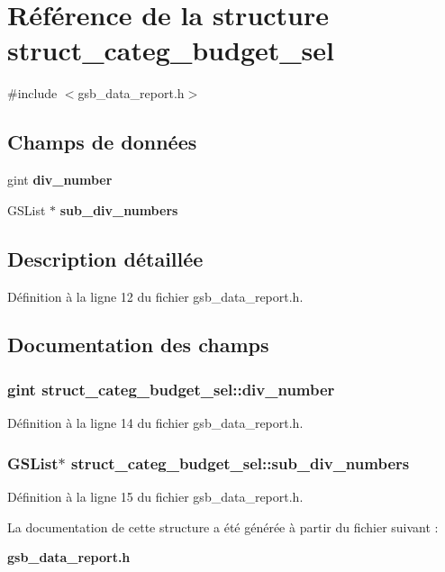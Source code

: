 \section{Référence de la structure struct\_\-categ\_\-budget\_\-sel}
\label{structstruct__categ__budget__sel}


{\ttfamily \#include $<$gsb\_\-data\_\-report.h$>$}

\subsection*{Champs de données}
\begin{DoxyCompactItemize}
\item 
gint {\bf div\_\-number}
\item 
GSList $\ast$ {\bf sub\_\-div\_\-numbers}
\end{DoxyCompactItemize}


\subsection{Description détaillée}


Définition à la ligne 12 du fichier gsb\_\-data\_\-report.h.



\subsection{Documentation des champs}
\subsubsection[{div\_\-number}]{\setlength{\rightskip}{0pt plus 5cm}gint {\bf struct\_\-categ\_\-budget\_\-sel::div\_\-number}}\label{structstruct__categ__budget__sel_ab4d8a88c70542ed25a12d707c95a7cfc}


Définition à la ligne 14 du fichier gsb\_\-data\_\-report.h.

\subsubsection[{sub\_\-div\_\-numbers}]{\setlength{\rightskip}{0pt plus 5cm}GSList$\ast$ {\bf struct\_\-categ\_\-budget\_\-sel::sub\_\-div\_\-numbers}}\label{structstruct__categ__budget__sel_a50367e87c3c0f1c70d293cd43e2c81d6}


Définition à la ligne 15 du fichier gsb\_\-data\_\-report.h.



La documentation de cette structure a été générée à partir du fichier suivant :\begin{DoxyCompactItemize}
\item 
{\bf gsb\_\-data\_\-report.h}\end{DoxyCompactItemize}
